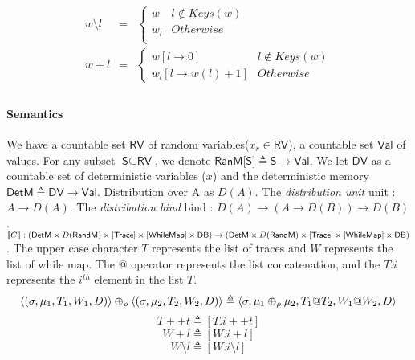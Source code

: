 \documentclass[a4paper,11pt]{article}
\begin{document}
%
\[
\begin{array}{ccl}
w \setminus l     & = &\left \{  
    \begin{array}{lr} w  & l \not\in Keys(w)   \\
      w_l & Otherwise \\
     \end{array} \right.\\
w + l & = &
 \left \{  
    \begin{array}{lr}
    w[l \to 0] & l \not \in Keys(w) \\   
    w_l [l \to w(l)+1] & Otherwise
          \end{array} \right.\\
\end{array}
\]
%
\paragraph{Semantics}
We have a countable set $\textsf{RV}$ of random variables($x_r \in \textsf{RV}$), a countable set $\textsf{Val}$ of values. For any subset  $\textsf{S} \subseteq \textsf{RV}$, we denote $\textsf{RanM[S]} \triangleq \textsf{S} \to \textsf{Val} $. We let $\textsf{DV}$ as a countable set of deterministic variables ($x$) and the deterministic memory $\textsf{DetM} \triangleq \textsf{DV} \to \textsf{Val}$. 
Distribution over A as $D(A)$. The \emph{distribution unit} unit : $A \to D(A)$. The \emph{distribution bind} bind : 
$ D(A) \to (A \to D(B)) \to D(B)$. 
\\
$\lrr{C}{} : 
(\textsf{DetM} \times D(\textsf{RandM}) \times \left[\textsf{Trace} \right]  
\times \left[\textsf{WhileMap} \right]  \times \textsf{DB} ) 
\to 
(\textsf{DetM} \times D(\textsf{RandM}) \times \left[\textsf{Trace} \right] 
\times \left[\textsf{WhileMap} \right]  \times \textsf{DB} ) $
.
The upper case character $T$ represents the list of traces and 
$W$ represents the list of while map.
The $@$ operator represents the list concatenation, and the
$T.i$ represents the $i^{th}$ element in the list $T$.
%
\[\langle (\sigma, \mu_1 , T_1, W_1, D) \rangle 
\oplus_{\rho} \langle (\sigma, \mu_2 , T_2, W_2, D) \rangle 
\triangleq 
\langle \sigma, \mu_1\oplus_{\rho} \mu_2 , 
T_1 @ T_2, W_1 @ W_2, D \rangle\]
%
\[T  ++ t \triangleq [T.i ++ t] \]
%
\[ W + l \triangleq [W.i + l] \]
%
\[ W \setminus l \triangleq [W.i \setminus l] \]
%
%
\end{document}
